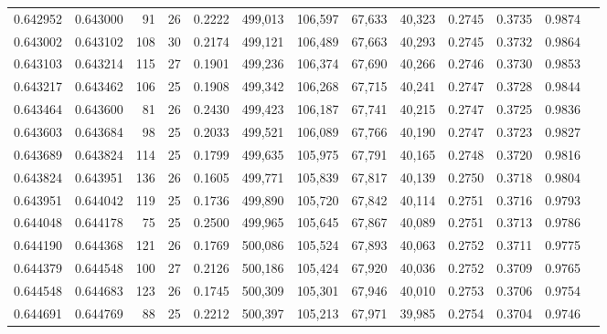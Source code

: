 \begin{tabular}{rrrrrrrrrrrrr}
0.642952 & 0.643000 &    91 &  26 &                                     0.2222 & 499,013 & 106,597 &  67,633 &  40,323 & 0.2745 & 0.3735 & 0.9874 \\
0.643002 & 0.643102 &   108 &  30 &                                     0.2174 & 499,121 & 106,489 &  67,663 &  40,293 & 0.2745 & 0.3732 & 0.9864 \\
0.643103 & 0.643214 &   115 &  27 &                                     0.1901 & 499,236 & 106,374 &  67,690 &  40,266 & 0.2746 & 0.3730 & 0.9853 \\
0.643217 & 0.643462 &   106 &  25 &                                     0.1908 & 499,342 & 106,268 &  67,715 &  40,241 & 0.2747 & 0.3728 & 0.9844 \\
0.643464 & 0.643600 &    81 &  26 &                                     0.2430 & 499,423 & 106,187 &  67,741 &  40,215 & 0.2747 & 0.3725 & 0.9836 \\
0.643603 & 0.643684 &    98 &  25 &                                     0.2033 & 499,521 & 106,089 &  67,766 &  40,190 & 0.2747 & 0.3723 & 0.9827 \\
0.643689 & 0.643824 &   114 &  25 &                                     0.1799 & 499,635 & 105,975 &  67,791 &  40,165 & 0.2748 & 0.3720 & 0.9816 \\
0.643824 & 0.643951 &   136 &  26 &                                     0.1605 & 499,771 & 105,839 &  67,817 &  40,139 & 0.2750 & 0.3718 & 0.9804 \\
0.643951 & 0.644042 &   119 &  25 &                                     0.1736 & 499,890 & 105,720 &  67,842 &  40,114 & 0.2751 & 0.3716 & 0.9793 \\
0.644048 & 0.644178 &    75 &  25 &                                     0.2500 & 499,965 & 105,645 &  67,867 &  40,089 & 0.2751 & 0.3713 & 0.9786 \\
0.644190 & 0.644368 &   121 &  26 &                                     0.1769 & 500,086 & 105,524 &  67,893 &  40,063 & 0.2752 & 0.3711 & 0.9775 \\
0.644379 & 0.644548 &   100 &  27 &                                     0.2126 & 500,186 & 105,424 &  67,920 &  40,036 & 0.2752 & 0.3709 & 0.9765 \\
0.644548 & 0.644683 &   123 &  26 &                                     0.1745 & 500,309 & 105,301 &  67,946 &  40,010 & 0.2753 & 0.3706 & 0.9754 \\
0.644691 & 0.644769 &    88 &  25 &                                     0.2212 & 500,397 & 105,213 &  67,971 &  39,985 & 0.2754 & 0.3704 & 0.9746 \\

\end{tabular}
